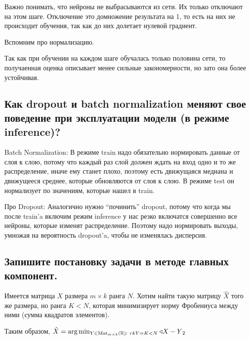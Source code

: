 Важно понимать, что нейроны не выбрасываются из сети. Их только отключают на этом шаге. Отключение это домножение результата на 1, то есть на них не происходит обучения, так как до них долетает нулевой градиент.

Вспомним про  нормализацию. 

Так как при обучении на каждом шаге обучалась только половина сети, то получаенная  оценка описывает менее сильные закономерности, но зато она более устойчивая.







\subsection{Как dropout и batch normalization меняют свое поведение при эксплуатации модели (в
режиме inference)?}

Batch Normalization: В режиме train надо обязательно нормировать данные от слоя к слою, потому что каждый раз слой должен ждать на вход одно и то же распределение, иначе ему станет плохо, поэтому есть движущаяся медиана и движущееся среднее, которые обновляются от слоя к слою. В режиме test он нормализует по значениям, которые нашел в train.

Про Dropout: Аналогично нужно “починить” dropout, потому что когда мы после train’a включим режим inference у нас резко включатся совершенно все нейроны, которые изменят распределение. Поэтому надо нормировать выходы, умножая на вероятность dropout’a, чтобы не изменялась дисперсия.








\subsection{Запишите постановку задачи в методе главных компонент.}

Имеется матрица $X$ размера $m \times k$ ранга $N$. Хотим найти такую матрицу $\hat{X}$ того же размера, но ранга $K < N$, которая минимизирует норму Фробениуса между ними (сумма квадратов элементов).

Таким образом, $\hat{X} = \arg\min_{Y \in \text{Mat}_{m \times k}(\mathbb{R}): \ rk Y = K < N} \triangleleft{X - Y}_2$